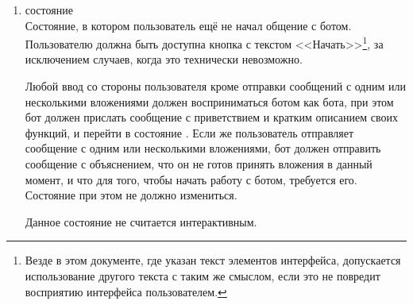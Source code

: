         \begin{enumerate}
            \item \label{itm:req:ui:states:init}
                 состояние \\
                Состояние, в котором пользователь ещё не начал общение с ботом.
                Пользователю должна быть доступна кнопка с текстом <<Начать>>\footnote{
                Везде в этом документе, где указан текст элементов интерфейса, допускается
                использование другого текста с таким же смыслом, если это не повредит восприятию
                интерфейса пользователем.}, за исключением случаев, когда это технически невозможно.

                Любой ввод со стороны пользователя кроме отправки сообщений с одним или несколькими
                вложениями должен восприниматься ботом как  бота, при этом бот должен прислать
                сообщение с приветствием и кратким описанием своих функций, и перейти в состояние
                \hyperref[itm:req:ui:states:mainmenu]{}.
                Если же пользователь отправляет сообщение с одним или несколькими
                вложениями, бот должен отправить сообщение с объяснением, что он не готов принять вложения
                в данный момент, и что для того, чтобы начать работу с ботом, требуется 
                его. Состояние при этом не должно измениться.

                Данное состояние не считается интерактивным.


\end{enumerate}
